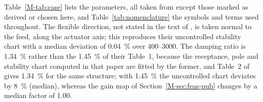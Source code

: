 Table~\ref{M-tab:case} lists the parameters, all taken from \citet{ozsoy2026robust} except those marked as derived or chosen here, and Table~\ref{tab:nomenclature} the symbols and terms used throughout. The flexible direction, not stated in the text of \citet{ozsoy2026robust}, is taken normal to the feed, along the actuator axis; this reproduces their uncontrolled stability chart with a median deviation of \SI{0.04}{\percent} over \SIrange{400}{3000}{\rpm}. The damping ratio is \SI{1.34}{\percent} rather than the \SI{1.45}{\percent} of their Table~1, because the receptance, pole and stability chart computed in that paper are fitted by the former, and Table~2 of \citet{ozsoy2025frequency} gives \SI{1.34}{\percent} for the same structure; with \SI{1.45}{\percent} the uncontrolled chart deviates by \SI{8}{\percent} (median), whereas the gain map of Section~\ref{M-sec:feas-pub} changes by a median factor of 1.00.

